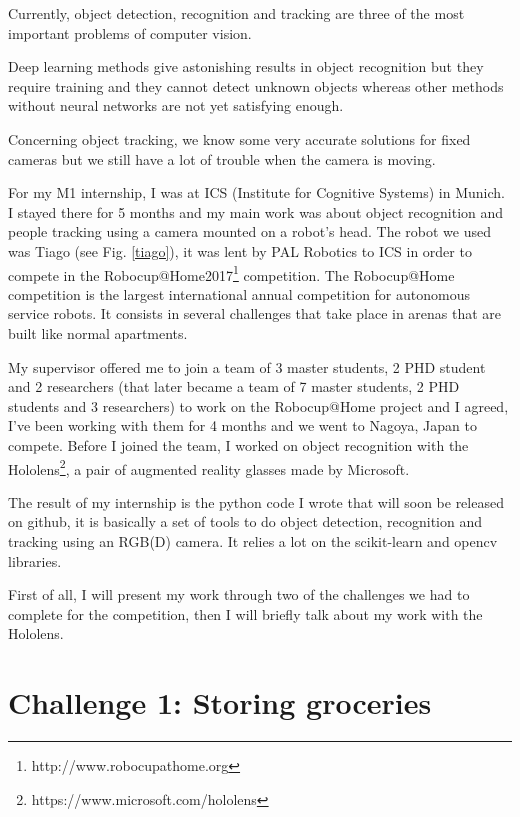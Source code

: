 \documentclass[a4paper, twocolumn]{article}
\begin{document}
    Currently, object detection, recognition and tracking are three of the most important problems of computer vision. 
    
    Deep learning methods give astonishing results in object recognition but they require training and they cannot detect unknown objects whereas other methods without neural networks are not yet satisfying enough. 
    
    Concerning object tracking, we know some very accurate solutions for fixed cameras but we still have a lot of trouble when the camera is moving.
    
    For my M1 internship, I was at ICS (Institute for Cognitive Systems) in Munich. I stayed there for 5 months and my main work was about object recognition and people tracking using a camera mounted on a robot's head. The robot we used was Tiago (see Fig. \ref{tiago}), it was lent by PAL Robotics to ICS in order to compete in the Robocup@Home2017\footnote{http://www.robocupathome.org} competition. The Robocup@Home competition is the largest international annual competition for autonomous service robots. It consists in several challenges that take place in arenas that are built like normal apartments.
    
    My supervisor offered me to join a team of 3 master students, 2 PHD student and 2 researchers (that later became a team of 7 master students, 2 PHD students and 3 researchers) to work on the Robocup@Home project and I agreed, I've been working with them for 4 months and we went to Nagoya, Japan to compete. Before I joined the team, I worked on object recognition with the Hololens\footnote{https://www.microsoft.com/hololens}, a pair of augmented reality glasses made by Microsoft.
    
    The result of my internship is the python code I wrote that will soon be released on github, it is basically a set of tools to do object detection, recognition and tracking using an RGB(D) camera. It relies a lot on the scikit-learn \cite{scikit-learn} and opencv \cite{itseez2015opencv} libraries.
    
    First of all, I will present my work through two of the challenges we had to complete for the competition, then I will briefly talk about my work with the Hololens.

    \section{Challenge 1: Storing groceries}
\end{document}

